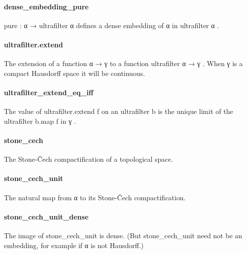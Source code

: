 \documentclass{article}
\begin{document}
\paragraph{dense\_embedding\_pure}
\par
\colorbox[RGB]{253,246,227}{{{{\color[RGB]{101, 123, 131} pure : α  }}}{{{\color[RGB]{133, 153, 0} → }}}{{{\color[RGB]{101, 123, 131}  ultrafilter α }}}} defines a dense embedding of 
\colorbox[RGB]{253,246,227}{{{{\color[RGB]{101, 123, 131} α }}}} in 
\colorbox[RGB]{253,246,227}{{{{\color[RGB]{101, 123, 131} ultrafilter α }}}}.
\paragraph{ultrafilter.extend}
\par
The extension of a function 
\colorbox[RGB]{253,246,227}{{{{\color[RGB]{101, 123, 131} α  }}}{{{\color[RGB]{133, 153, 0} → }}}{{{\color[RGB]{101, 123, 131}  γ }}}} to a function 
\colorbox[RGB]{253,246,227}{{{{\color[RGB]{101, 123, 131} ultrafilter α  }}}{{{\color[RGB]{133, 153, 0} → }}}{{{\color[RGB]{101, 123, 131}  γ }}}}.
When 
\colorbox[RGB]{253,246,227}{{{{\color[RGB]{101, 123, 131} γ }}}} is a compact Hausdorff space it will be continuous.
\paragraph{ultrafilter\_extend\_eq\_iff}
\par
The value of 
\colorbox[RGB]{253,246,227}{{{{\color[RGB]{101, 123, 131} ultrafilter.extend f }}}} on an ultrafilter 
\colorbox[RGB]{253,246,227}{{{{\color[RGB]{101, 123, 131} b }}}} is the
unique limit of the ultrafilter 
\colorbox[RGB]{253,246,227}{{{{\color[RGB]{101, 123, 131} b.map f }}}} in 
\colorbox[RGB]{253,246,227}{{{{\color[RGB]{101, 123, 131} γ }}}}.
\paragraph{stone\_cech}
\par
The Stone-Čech compactification of a topological space.
\paragraph{stone\_cech\_unit}
\par
The natural map from α to its Stone-Čech compactification.
\paragraph{stone\_cech\_unit\_dense}
\par
The image of stone\_cech\_unit is dense. (But stone\_cech\_unit need
not be an embedding, for example if α is not Hausdorff.)
\end{document}
